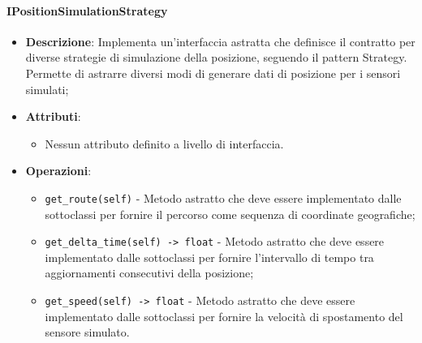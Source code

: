 \documentclass[10pt]{article}
\begin{document}
    \paragraph{IPositionSimulationStrategy}
    \begin{itemize} 
    \item \textbf{Descrizione}: Implementa un'interfaccia astratta che definisce il contratto per diverse strategie di simulazione della posizione, seguendo il pattern Strategy. Permette di astrarre diversi modi di generare dati di posizione per i sensori simulati;
    \item \textbf{Attributi}:
    \begin{itemize}
        \item Nessun attributo definito a livello di interfaccia.
    \end{itemize}
    
    \item \textbf{Operazioni}:
    \begin{itemize}
        \item \texttt{get\_route(self)} - Metodo astratto che deve essere implementato dalle sottoclassi per fornire il percorso come sequenza di coordinate geografiche;
        
        \item \texttt{get\_delta\_time(self) -> float} - Metodo astratto che deve essere implementato dalle sottoclassi per fornire l'intervallo di tempo tra aggiornamenti consecutivi della posizione;
        
        \item \texttt{get\_speed(self) -> float} - Metodo astratto che deve essere implementato dalle sottoclassi per fornire la velocità di spostamento del sensore simulato.
    \end{itemize}
    \end{itemize}
\end{document}
